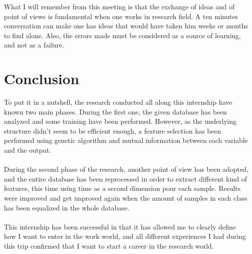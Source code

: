 \documentclass{report}
\begin{document}
	What I will remember from this meeting is that the exchange of ideas and of point of views is fundamental when one works in research field. A ten minutes conversation can make one has ideas that would have taken him weeks or months to find alone. Also, the errors made must be considered as a source of learning, and not as a failure.
	
	\chapter{Conclusion}
	
	To put it in a nutshell, the research conducted all along this internship have known two main phases. During the first one, the given database has been analyzed and some training have been performed. However, as the underlying structure didn't seem to be efficient enough, a feature selection has been performed using genetic algorithm and mutual information between each variable and the output.\\\\
	During the second phase of the research, another point of view has been adopted, and the entire database has been reprocessed in order to extract different kind of features, this time using time as a second dimension pour each sample. Results were improved and get improved again when the amount of samples in each class has been equalized in the whole database.\\\\
	This internship has been successful in that it has allowed me to clearly define how I want to enter in the work world, and all different experiences I had during this trip confirmed that I want to start a career in the research world.
	
	
	
	
	
\end{document}
